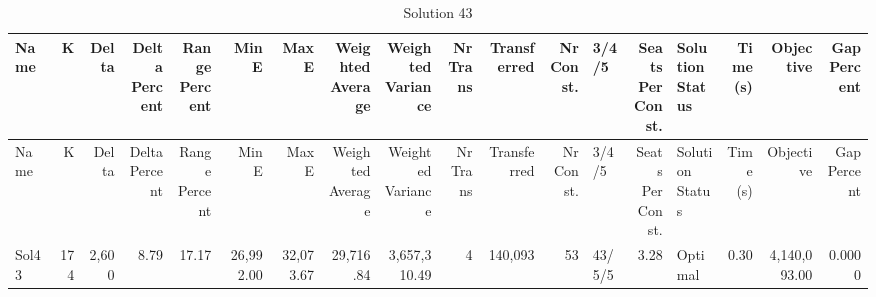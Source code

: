 \documentclass[a4paper]{article}
\begin{document}
{\scriptsize
\begin{longtable}{lrrrrrrrrrrrlrlrrr}
\caption{Solution 43}
\\ \toprule
Name &K &Delta &\shortstack{Delta\\Percent} &\shortstack{Range\\Percent} &Min E &Max E &\shortstack{Weighted\\Average} &\shortstack{Weighted\\Variance} &\shortstack{Nr\\Trans} &Transferred &\shortstack{Nr\\Const.} &3/4/5 &\shortstack{Seats\\Per\\Const.} &\shortstack{Solution\\Status} &\shortstack{Time\\(s)} &Objective &\shortstack{Gap\\Percent} \\ \midrule
\endfirsthead
\toprule
Name &K &Delta &\shortstack{Delta\\Percent} &\shortstack{Range\\Percent} &Min E &Max E &\shortstack{Weighted\\Average} &\shortstack{Weighted\\Variance} &\shortstack{Nr\\Trans} &Transferred &\shortstack{Nr\\Const.} &3/4/5 &\shortstack{Seats\\Per\\Const.} &\shortstack{Solution\\Status} &\shortstack{Time\\(s)} &Objective &\shortstack{Gap\\Percent} \\ \midrule
\endhead
\bottomrule
\endfoot
Sol43&174&2,600& 8.79&17.17&26,992.00&32,073.67&29,716.84&3,657,310.49&4&140,093&53&43/5/5& 3.28&Optimal& 0.30&4,140,093.00&0.0000\\ 
\end{longtable}

}
\end{document}
